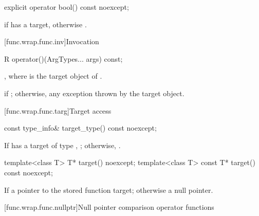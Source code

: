%
\begin{itemdecl}
explicit operator bool() const noexcept;
\end{itemdecl}

\begin{itemdescr}
\pnum
\returns
{} if  has a target, otherwise .
\end{itemdescr}

[func.wrap.func.inv]{Invocation}

%
%
\begin{itemdecl}
R operator()(ArgTypes... args) const;
\end{itemdecl}

\begin{itemdescr}
\pnum
\returns
{},
where  is the target object of .

\pnum
\throws
{} if ; otherwise, any
exception thrown by the target object.
\end{itemdescr}

[func.wrap.func.targ]{Target access}

%
\begin{itemdecl}
const type_info& target_type() const noexcept;
\end{itemdecl}

\begin{itemdescr}
\pnum
\returns
If  has a target of type ,
  ; otherwise, .
\end{itemdescr}

%
\begin{itemdecl}
template<class T>       T* target() noexcept;
template<class T> const T* target() const noexcept;
\end{itemdecl}

\begin{itemdescr}
\pnum
\returns
If 
a pointer to the stored function target; otherwise a null pointer.
\end{itemdescr}

[func.wrap.func.nullptr]{Null pointer comparison operator functions}

